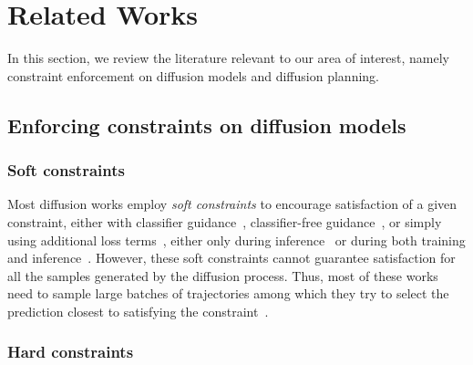 \section{Related Works}
\label{sec: related works}

In this section, we review the literature relevant to our area of interest, namely constraint enforcement on diffusion models and diffusion planning.

\subsection{Enforcing constraints on diffusion models}

\subsubsection{Soft constraints}

Most diffusion works employ \emph{soft constraints} to encourage satisfaction of a given constraint, either with classifier guidance~\citep{Trajectory, RyneBeeson, beat_GAN}, classifier-free guidance~\citep{power2023sampling}, or simply using additional loss terms~\citep{bastek2024physics, carvalho2023motion, giannone2024aligning, sun2024conformal, Diff-RNTraj}, either only during inference~\citep{carvalho2023motion, giannone2024aligning} or during both training and inference~\citep{bastek2024physics, Trajectory, RyneBeeson, sun2024conformal, Diff-RNTraj}.
However, these soft constraints cannot guarantee satisfaction for all the samples generated by the diffusion process. Thus, most of these works need to sample large batches of trajectories among which they try to select the prediction closest to satisfying the constraint~\citep{Trajectory, carvalho2023motion}.



\subsubsection{Hard constraints}

